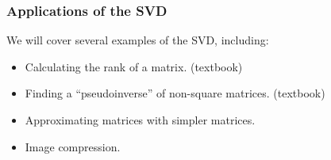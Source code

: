 \documentclass{beamer}
\begin{document}
\begin{frame}
\frametitle{Applications of the SVD}

We will cover several examples of the SVD, including:
\begin{itemize}
	\item Calculating the rank of a matrix. (textbook)
	\item Finding a ``pseudoinverse'' of non-square matrices. (textbook)
	\item Approximating matrices with simpler matrices.
	\item Image compression.
\end{itemize}	
\end{frame}
\end{document}
